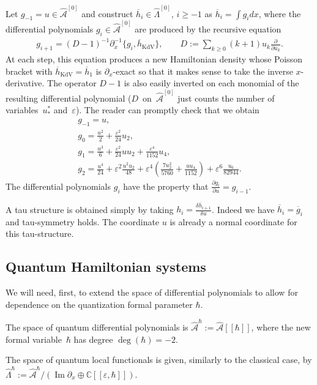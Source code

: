 \documentclass[pdftex]{sigma}
\numberwithin{equation}{section}
\newcommand{\mbC}{\mathbb C}
\newcommand{\og}{\overline g}
\newcommand{\oh}{\overline h}
\newcommand{\hLambda}{\widehat\Lambda}
\renewcommand{\Im}{\operatorname{Im}}
\def\d{{\partial}}
\newcommand{\<}{\left<}
\renewcommand{\>}{\right>}
\newcommand{\eps}{\varepsilon}
\newcommand{\hcA}{\widehat{\mathcal A}}
\begin{document}
Let $g_{-1} = u \in \hcA^{[0]}$ and construct $\oh_i \in \hLambda^{[0]}$, $i\geq -1$ as $\oh_i = \int g_i dx$, where the dif\/ferential polynomials $g_i \in \hcA^{[0]}$ are produced by the recursive equation
\begin{gather*}g_{i+1} = (D-1)^{-1} \d_x^{-1}\big\{g_{i} ,\oh_{\mathrm{KdV}}\big\}, \qquad D:= \sum_{k\geq 0} (k+1) u_k \frac{\d}{\d u_k}.\end{gather*}
At each step, this equation produces a new Hamiltonian density whose Poisson bracket with $\oh_{\mathrm{KdV}} = \oh_1$ is $\d_x$-exact so that it makes sense to take the inverse $x$-derivative. The operator $D-1$ is also easily inverted on each monomial of the resulting dif\/ferential polynomial ($D$~on~$\hcA^{[0]}$ just counts the number of variables~$u^*_*$ and~$\eps$). The reader can promptly check that we obtain
\begin{gather*}
g_{-1} = u,\\
g_0= \frac{u^2}{2}+ \frac{\eps^2}{24} u_2,\\
g_1= \frac{u^3}{6} + \frac{\eps^2}{24} u u_{2} + \frac{\eps^4}{1152} u_4,\\
g_2= \frac{u^4}{24}+\eps^2\frac{u^2 u_2}{48}+\eps^4\left(\frac{7u_2^2}{5760}+\frac{u u_4}{1152}\right)+\eps^6 \frac{u_6}{82944}.
\end{gather*}
The dif\/ferential polynomials $g_i$ have the property that $\frac{\d g_{i}}{\d u} = g_{i-1}$.

A tau structure is obtained simply by taking $h_{i} = \frac{\delta \oh_{i+1}}{\delta u}$. Indeed we have $\oh_i = \og_i $ and tau-symmetry holds. The coordinate $u$ is already a normal coordinate for this tau-structure.

\subsection{Quantum Hamiltonian systems}\label{section:quantum hamiltonian systems}

We will need, f\/irst, to extend the space of dif\/ferential polynomials to allow for dependence on the quantization formal parameter $\hbar$.

The space of quantum dif\/ferential polynomials is $\hcA^\hbar := \hcA[[\hbar]]$, where the new formal variable~$\hbar$ has degree $\deg(\hbar) = -2$.

The space of quantum local functionals is given, similarly to the classical case, by $\hLambda^\hbar:= \hcA^\hbar/( \Im \d_x \oplus \mbC[[\eps,\hbar]])$.
\end{document}
